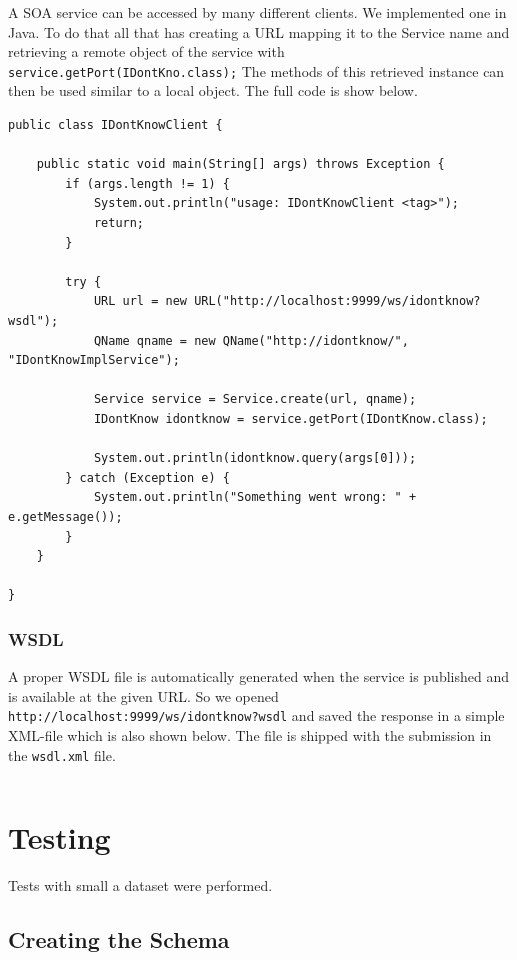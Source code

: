 \documentclass[11pt, a4paper]{article}
\begin{document}
A SOA service can be accessed by many different clients. We implemented one in Java. To do that all that has creating a URL mapping it to the Service name and retrieving a remote  object of the service with \lstinline|service.getPort(IDontKno.class);| The methods of this retrieved instance can then be used similar to a local object. The full code is show below.

\begin{lstlisting}
public class IDontKnowClient {

	public static void main(String[] args) throws Exception {
		if (args.length != 1) {
			System.out.println("usage: IDontKnowClient <tag>");
			return;
		}

		try {
			URL url = new URL("http://localhost:9999/ws/idontknow?wsdl");
			QName qname = new QName("http://idontknow/", "IDontKnowImplService");

			Service service = Service.create(url, qname);
			IDontKnow idontknow = service.getPort(IDontKnow.class);

			System.out.println(idontknow.query(args[0]));
		} catch (Exception e) {
			System.out.println("Something went wrong: " + e.getMessage());
		}
	}

}
\end{lstlisting}

\subsubsection{WSDL}

A proper WSDL file is automatically generated when the service is published and is available at the given URL. So we opened \lstinline|http://localhost:9999/ws/idontknow?wsdl| and saved the response in a simple XML-file which is also shown below. The file is shipped with the submission in the \lstinline|wsdl.xml| file.

\begin{lstlisting}

\end{lstlisting}

\section{Testing}

Tests with small a dataset were performed. 

\subsection{Creating the Schema}
\end{document}
